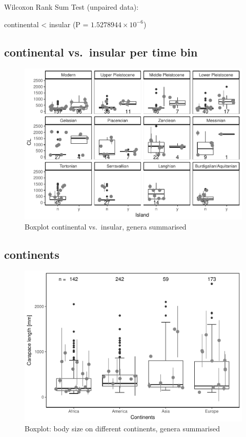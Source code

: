 \documentclass[]{article}
\begin{document}
Wilcoxon Rank Sum Test (unpaired data):

continental \textless{} insular (P = \(1.5278944\times 10^{-6}\))

\newpage

\subsection{continental vs.~insular per time
bin}\label{continental-vs.insular-per-time-bin-1}

\begin{figure}[htbp]
\centering
\includegraphics{MA_JJ_files/figure-latex/BPCIBins-1.pdf}
\caption{Boxplot continental vs.~insular, genera summarised}
\end{figure}

\newpage

\subsection{continents}\label{continents-1}

\begin{figure}[htbp]
\centering
\includegraphics{MA_JJ_files/figure-latex/BPCon-1.pdf}
\caption{Boxplot: body size on different continents, genera summarised}
\end{figure}
\end{document}
